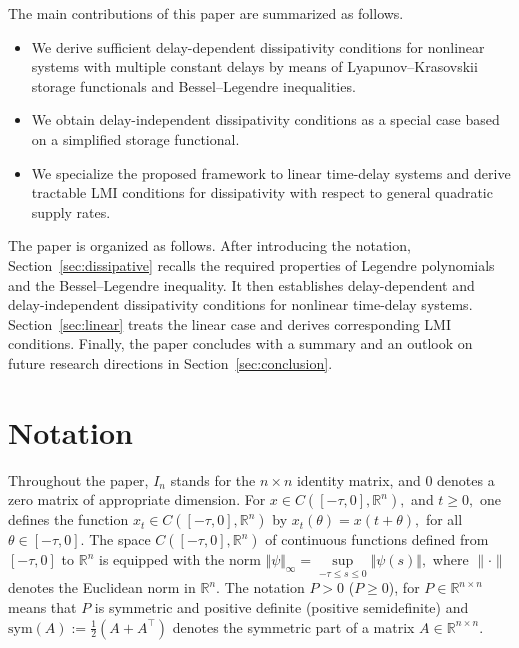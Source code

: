 \documentclass[12pt]{article}
\begin{document}
The main contributions of this paper are summarized as follows.
\begin{itemize}
\item We derive sufficient delay-dependent dissipativity conditions for nonlinear systems with multiple constant delays by means of Lyapunov--Krasovskii storage functionals and Bessel--Legendre inequalities.
\item We obtain delay-independent dissipativity conditions as a special case based on a simplified storage functional.
\item We specialize the proposed framework to linear time-delay systems and derive tractable LMI conditions for dissipativity with respect to general quadratic supply rates.
\end{itemize}
The paper is organized as follows. After introducing the notation, Section~\ref{sec:dissipative} recalls the required properties of Legendre polynomials and the Bessel--Legendre inequality. It then establishes delay-dependent and delay-\linebreak independent dissipativity conditions for nonlinear time-delay systems. Section~\ref{sec:linear} treats the linear case and derives corresponding LMI conditions. Finally, the paper concludes with a summary and an outlook on future research directions in Section~\ref{sec:conclusion}.

\section*{Notation}
Throughout the paper, $I_n$ stands for the $n \times n$ identity matrix, and $0$ denotes a zero matrix of appropriate dimension.
For $x \in  C([-\tau,0],\mathbb{R}^{n}),$ and 
$t \geqslant 0,$ one defines the function  
$x_t \in  C([-\tau,0],\mathbb{R}^{n})$ by 
$x_t(\theta) = x(t+\theta),$ for all $\theta 
\in [-\tau, 0].$ The space $C([-
\tau,0],\mathbb{R}^{n})$ of continuous functions defined from $[-
\tau,0]$ to $\mathbb{R}^{n}$  is equipped with the norm
$ \Vert \psi \Vert_{\infty} = \sup\limits_{-\tau \leqslant 
s \leqslant 0} \Vert \psi(s)\Vert,$ where  $\|\cdot\|$ denotes the Euclidean norm in $\mathbb{R}^n.$ The notation $P>0$ ($P \ge 0$), for $P \in \mathbb{R}^{n \times 
n}$ means that $P$ is symmetric and positive definite (positive 
semidefinite) and $\mathrm{sym}(A) := \frac{1}{2}(A + A^\top)$ denotes the symmetric part of a matrix $A \in \mathbb{R}^{n \times n }.$
\end{document}
